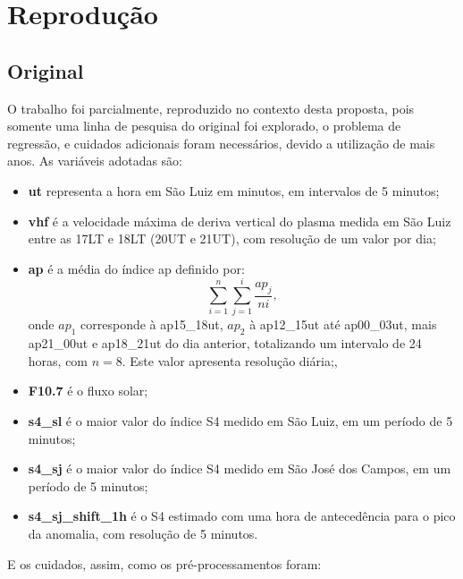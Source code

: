 \section{Reprodução}

\subsection{Original}

O trabalho \cite{REZENDE:2009} foi parcialmente, reproduzido no contexto desta proposta, pois somente uma linha de pesquisa do original foi explorado, o problema de regressão, e cuidados adicionais foram necessários, devido a utilização de mais anos. As variáveis adotadas são:

\begin{itemize}
\item {\bf ut} representa a hora em São Luiz em minutos, em intervalos de 5 minutos;
\item {\bf vhf} é a velocidade máxima de deriva vertical do plasma medida em São Luiz entre as 17LT e 18LT (20UT e 21UT), com resolução de um valor por dia;
\item {\bf ap} é a média do índice ap definido por:
\begin{equation}
\sum_{i=1}^{n}\sum_{j=1}^{i}\frac{ap_{j}}{ni}\mbox{,}~
\end{equation}
onde $ap_1$ corresponde à ap15\_18ut, $ap_2$ à ap12\_15ut até ap00\_03ut, mais ap21\_00ut e ap18\_21ut do dia anterior, totalizando um intervalo de 24 horas, com $n=8$. Este valor apresenta resolução diária;,
\item {\bf F10.7} é o fluxo solar;
\item {\bf s4\_sl} é o maior valor do índice S4 medido em São Luiz, em um período de 5 minutos;
\item {\bf s4\_sj} é o maior valor do índice S4 medido em São José dos Campos, em um período de 5 minutos;
\item {\bf s4\_sj\_shift\_1h} é o S4 estimado com uma hora de antecedência para o pico da anomalia, com resolução de 5 minutos.
\end{itemize}

E os cuidados, assim, como os pré-processamentos foram:

